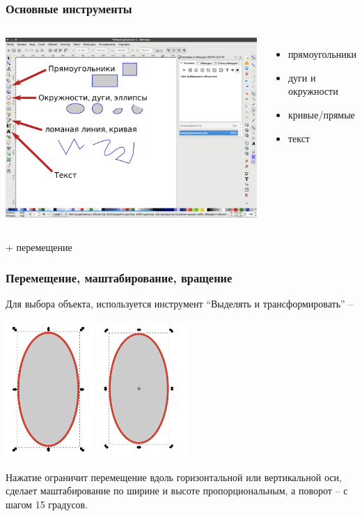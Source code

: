 \documentclass[12pt, compress]{beamer}
\renewcommand{\emph}[1]{\textcolor{dark-blue}{#1}}
\begin{document}
\begin{frame}[c]
\frametitle{Основные инструменты}
\begin{columns}
\includegraphics[trim={0 0 15cm 0},clip, width=0.9\linewidth]{Основные_инструменты.png}
\begin{itemize}
  \item {} прямоугольники
  \item {} дуги и окружности 
  \item {} кривые/прямые 
  \item {} текст
\end{itemize}
\end{columns}
 + перемещение
\end{frame}

\begin{frame}[c]
\frametitle{Перемещение, маштабирование, вращение}
Для выбора объекта, используется инструмент \emph{``Выделять и трансформировать''} --  

\includegraphics[width=0.25\textwidth]{масштаб.png}
\includegraphics[width=0.26\textwidth]{поворот.png}

Нажатие  ограничит перемещение вдоль горизонтальной или вертикальной оси, сделает маштабирование по ширине и высоте пропорциональным, а поворот -- с шагом 15 градусов.
\end{frame}
\end{document}
